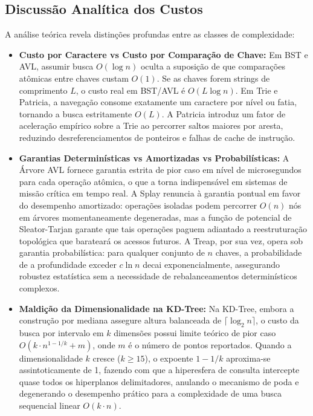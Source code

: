 \documentclass[11pt,a4paper]{article}
\newcommand{\Ogrande}[1]{\ensuremath{O\!\left(#1\right)}}
\begin{document}
\subsection{Discussão Analítica dos Custos}
A análise teórica revela distinções profundas entre as classes de complexidade:
\begin{itemize}[leftmargin=*]
  \item \textbf{Custo por Caractere vs Custo por Comparação de Chave:} Em BST e AVL, assumir busca $\Ogrande{\log n}$ oculta a suposição de que comparações atômicas entre chaves custam $\Ogrande{1}$. Se as chaves forem strings de comprimento $L$, o custo real em BST/AVL é $\Ogrande{L \log n}$. Em Trie e Patricia, a navegação consome exatamente um caractere por nível ou fatia, tornando a busca estritamente $\Ogrande{L}$. A Patricia introduz um fator de aceleração empírico sobre a Trie ao percorrer saltos maiores por aresta, reduzindo desreferenciamentos de ponteiros e falhas de cache de instrução.
  \item \textbf{Garantias Determinísticas vs Amortizadas vs Probabilísticas:} A Árvore AVL fornece garantia estrita de pior caso em nível de microsegundos para cada operação atômica, o que a torna indispensável em sistemas de missão crítica em tempo real. A Splay renuncia à garantia pontual em favor do desempenho amortizado: operações isoladas podem percorrer $\Ogrande{n}$ nós em árvores momentaneamente degeneradas, mas a função de potencial de Sleator-Tarjan garante que tais operações paguem adiantado a reestruturação topológica que barateará os acessos futuros. A Treap, por sua vez, opera sob garantia probabilística: para qualquer conjunto de $n$ chaves, a probabilidade de a profundidade exceder $c \ln n$ decai exponencialmente, assegurando robustez estatística sem a necessidade de rebalanceamentos determinísticos complexos.
  \item \textbf{Maldição da Dimensionalidade na KD-Tree:} Na KD-Tree, embora a construção por mediana assegure altura balanceada de $\lceil \log_2 n \rceil$, o custo da busca por intervalo em $k$ dimensões possui limite teórico de pior caso $\Ogrande{k \cdot n^{1-1/k} + m}$, onde $m$ é o número de pontos reportados. Quando a dimensionalidade $k$ cresce ($k \ge 15$), o expoente $1 - 1/k$ aproxima-se assintoticamente de 1, fazendo com que a hiperesfera de consulta intercepte quase todos os hiperplanos delimitadores, anulando o mecanismo de poda e degenerando o desempenho prático para a complexidade de uma busca sequencial linear $\Ogrande{k \cdot n}$.
\end{itemize}
\end{document}
